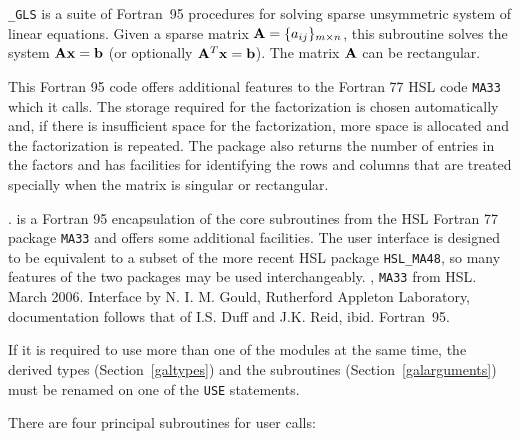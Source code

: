 \documentclass{galahad}
\newcommand{\packagename}{GLS}
\newcommand{\fullpackagename}{\libraryname\_\packagename}
\begin{document}
\galheader


\galsummary

{\tt \fullpackagename} is a suite of Fortran~95 procedures 
for solving sparse unsymmetric system of linear equations. Given
a sparse matrix ${\mathbf{A}} = \{a_{ij}\}_{m \times n}$, this
subroutine solves the system ${\mathbf{A}} {\mathbf{x}} = {\mathbf{b}}$ (or optionally
${\mathbf{A}}^T {\mathbf{x}} = {\mathbf{b}}$).
The matrix ${\mathbf{A}}$ can be rectangular. 

This Fortran 95 code offers additional features to the Fortran 77 HSL code 
{\tt MA33} which it calls. The storage required for the factorization is chosen
automatically and, if there is insufficient space for the factorization,
more space is allocated and the factorization is repeated.  The package
also returns the number of entries in the factors and has facilities
for identifying the rows and columns that are treated specially 
when the matrix is singular or rectangular.


\galattributes
\galversions{\tt  \fullpackagename\_single, \fullpackagename\_double}.
\galremark {\tt GALAHAD\_\packagename} is a Fortran 95 encapsulation of 
the core subroutines from the HSL Fortran 77 package {\tt MA33} and offers some 
additional facilities.  The user interface is designed to be
equivalent to a subset of the more recent HSL package {\tt HSL\_MA48}, 
so many features of the two packages may be used interchangeably.
, {\tt MA33} from HSL.
\galdate March 2006.
\galorigin Interface by N. I. M. Gould, Rutherford Appleton Laboratory,
documentation follows that of I.S. Duff and J.K. Reid, ibid.
\gallanguage Fortran~95. 


\galhowto



\noindent
If it is required to use more than one of the modules at the same time, 
the derived types
(Section~\ref{galtypes})
and the subroutines
(Section~\ref{galarguments})
must be renamed on one of the {\tt USE} statements.

There are four principal subroutines for user calls:
\end{document}

